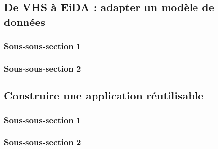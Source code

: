 
\subsection{De VHS à EiDA : adapter un modèle de données}
    \subsubsection{Sous-sous-section 1}
    
    \subsubsection{Sous-sous-section 2}
    
    
    \subsection{Construire une application réutilisable}
        \subsubsection{Sous-sous-section 1}


        \subsubsection{Sous-sous-section 2}

